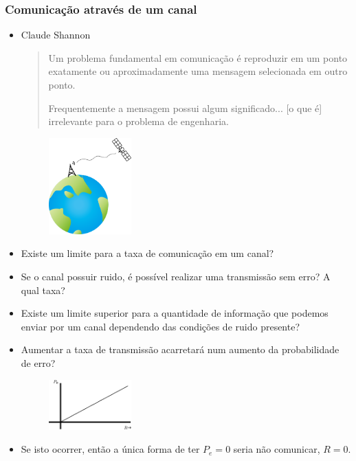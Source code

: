 \begin{frame}[allowframebreaks]
  \frametitle{Comunicação através de um canal}
  \begin{itemize}
  \item Claude Shannon
	\begin{quote}
	Um problema fundamental em comunicação é reproduzir em um ponto
	exatamente ou aproximadamente uma mensagem selecionada em outro ponto.

	Frequentemente a mensagem possui algum significado... [o que é] irrelevante
	para o problema de engenharia. 
	\end{quote}
                \begin{figure}[h!]
                \centering
                \includegraphics[width=0.3\textwidth]{images/earth-satellite.pdf}
                \label{fig:rhyolitesat}
                \end{figure}
  \item Existe um limite para a taxa de comunicação em um canal?
  \item Se o canal possuir ruido, é possível realizar uma transmissão sem erro? A qual taxa?
  \item Existe um limite superior para a quantidade de informação que podemos enviar por um canal
	dependendo das condições de ruido presente?
  \item Aumentar a taxa de transmissão acarretará num aumento da probabilidade de erro?
                \begin{figure}[h!]
                \centering
                \includegraphics[width=0.3\textwidth]{images/rvspe1930.pdf}
                \label{fig:rvspe1930}
                \end{figure}
  \item Se isto ocorrer, então a única forma de ter $P_e = 0$ seria não comunicar, $R=0$.
  \end{itemize}


\end{frame}
